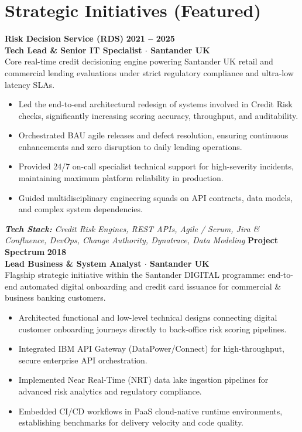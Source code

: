 \documentclass[10pt,a4paper]{article}
\begin{document}
\section{Strategic Initiatives (Featured)}
\noindent\textbf{\large Risk Decision Service (RDS)} \hfill {\color{SynthBlue}\textbf{2021 -- 2025}} \\
{\color{SynthPink}\textbf{Tech Lead \& Senior IT Specialist $\cdot$ Santander UK}} \\
\vspace{2pt}
Core real-time credit decisioning engine powering Santander UK retail and commercial lending evaluations under strict regulatory compliance and ultra-low latency SLAs.
\begin{itemize}[leftmargin=1.5em, itemsep=1.5pt, topsep=2pt]
    \item Led the end-to-end architectural redesign of systems involved in Credit Risk checks, significantly increasing scoring accuracy, throughput, and auditability.
    \item Orchestrated BAU agile releases and defect resolution, ensuring continuous enhancements and zero disruption to daily lending operations.
    \item Provided 24/7 on-call specialist technical support for high-severity incidents, maintaining maximum platform reliability in production.
    \item Guided multidisciplinary engineering squads on API contracts, data models, and complex system dependencies.
\end{itemize}
\noindent\textit{\footnotesize \textbf{Tech Stack:} Credit Risk Engines, REST APIs, Agile / Scrum, Jira \& Confluence, DevOps, Change Authority, Dynatrace, Data Modeling}
\vspace{10pt}
\noindent\textbf{\large Project Spectrum} \hfill {\color{SynthBlue}\textbf{2018}} \\
{\color{SynthPink}\textbf{Lead Business \& System Analyst $\cdot$ Santander UK}} \\
\vspace{2pt}
Flagship strategic initiative within the Santander DIGITAL programme: end-to-end automated digital onboarding and credit card issuance for commercial \& business banking customers.
\begin{itemize}[leftmargin=1.5em, itemsep=1.5pt, topsep=2pt]
    \item Architected functional and low-level technical designs connecting digital customer onboarding journeys directly to back-office risk scoring pipelines.
    \item Integrated IBM API Gateway (DataPower/Connect) for high-throughput, secure enterprise API orchestration.
    \item Implemented Near Real-Time (NRT) data lake ingestion pipelines for advanced risk analytics and regulatory compliance.
    \item Embedded CI/CD workflows in PaaS cloud-native runtime environments, establishing benchmarks for delivery velocity and code quality.
\end{itemize}
\end{document}
